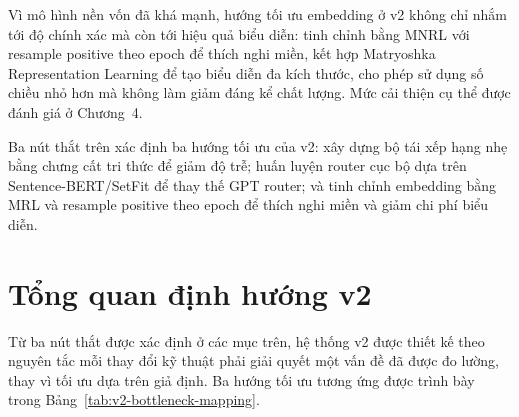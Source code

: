 \documentclass[../DoAn.tex]{subfiles}
\begin{document}
Vì mô hình nền vốn đã khá mạnh, hướng tối ưu embedding ở v2 không chỉ nhắm tới độ chính xác mà còn tới hiệu quả biểu diễn: tinh chỉnh bằng MNRL với resample positive theo epoch để thích nghi miền, kết hợp Matryoshka Representation Learning để tạo biểu diễn đa kích thước, cho phép sử dụng số chiều nhỏ hơn mà không làm giảm đáng kể chất lượng. Mức cải thiện cụ thể được đánh giá ở Chương~4.

Ba nút thắt trên xác định ba hướng tối ưu của v2: xây dựng bộ tái xếp hạng nhẹ bằng chưng cất tri thức để giảm độ trễ; huấn luyện router cục bộ dựa trên Sentence-BERT/SetFit để thay thế GPT router; và tinh chỉnh embedding bằng MRL và resample positive theo epoch để thích nghi miền và giảm chi phí biểu diễn.

\section{Tổng quan định hướng v2}
\label{section:3.6}

Từ ba nút thắt được xác định ở các mục trên, hệ thống v2 được thiết kế theo nguyên tắc mỗi thay đổi kỹ thuật phải giải quyết một vấn đề đã được đo lường, thay vì tối ưu dựa trên giả định. Ba hướng tối ưu tương ứng được trình bày trong Bảng~\ref{tab:v2-bottleneck-mapping}.

\begin{table}[H]
    \centering
    \caption{Ánh xạ nút thắt của v1 sang giải pháp v2}
    \label{tab:v2-bottleneck-mapping}
    {\small
    \setlength{\tabcolsep}{4pt}
    }
\end{table}
\end{document}
